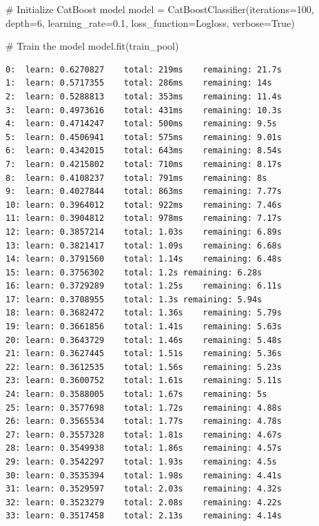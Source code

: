 \documentclass[
  letterpaper,
  DIV=11,
  numbers=noendperiod]{scrartcl}
\newenvironment{Shaded}{\begin{snugshade}}{\end{snugshade}}
\newcommand{\CommentTok}[1]{\textcolor[rgb]{0.37,0.37,0.37}{#1}}
\newcommand{\DecValTok}[1]{\textcolor[rgb]{0.68,0.00,0.00}{#1}}
\newcommand{\FloatTok}[1]{\textcolor[rgb]{0.68,0.00,0.00}{#1}}
\newcommand{\NormalTok}[1]{\textcolor[rgb]{0.00,0.23,0.31}{#1}}
\newcommand{\OperatorTok}[1]{\textcolor[rgb]{0.37,0.37,0.37}{#1}}
\newcommand{\StringTok}[1]{\textcolor[rgb]{0.13,0.47,0.30}{#1}}
\newcommand{\VariableTok}[1]{\textcolor[rgb]{0.07,0.07,0.07}{#1}}
\begin{document}
\begin{Shaded}
\begin{Highlighting}[]
\CommentTok{\# Initialize CatBoost model}
\NormalTok{model }\OperatorTok{=}\NormalTok{ CatBoostClassifier(iterations}\OperatorTok{=}\DecValTok{100}\NormalTok{, depth}\OperatorTok{=}\DecValTok{6}\NormalTok{, learning\_rate}\OperatorTok{=}\FloatTok{0.1}\NormalTok{, loss\_function}\OperatorTok{=}\StringTok{\textquotesingle{}Logloss\textquotesingle{}}\NormalTok{, verbose}\OperatorTok{=}\VariableTok{True}\NormalTok{)}

\CommentTok{\# Train the model}
\NormalTok{model.fit(train\_pool)}
\end{Highlighting}
\end{Shaded}

\begin{verbatim}
0:  learn: 0.6270827    total: 219ms    remaining: 21.7s
1:  learn: 0.5717355    total: 286ms    remaining: 14s
2:  learn: 0.5288813    total: 353ms    remaining: 11.4s
3:  learn: 0.4973616    total: 431ms    remaining: 10.3s
4:  learn: 0.4714247    total: 500ms    remaining: 9.5s
5:  learn: 0.4506941    total: 575ms    remaining: 9.01s
6:  learn: 0.4342015    total: 643ms    remaining: 8.54s
7:  learn: 0.4215802    total: 710ms    remaining: 8.17s
8:  learn: 0.4108237    total: 791ms    remaining: 8s
9:  learn: 0.4027844    total: 863ms    remaining: 7.77s
10: learn: 0.3964012    total: 922ms    remaining: 7.46s
11: learn: 0.3904812    total: 978ms    remaining: 7.17s
12: learn: 0.3857214    total: 1.03s    remaining: 6.89s
13: learn: 0.3821417    total: 1.09s    remaining: 6.68s
14: learn: 0.3791560    total: 1.14s    remaining: 6.48s
15: learn: 0.3756302    total: 1.2s remaining: 6.28s
16: learn: 0.3729289    total: 1.25s    remaining: 6.11s
17: learn: 0.3708955    total: 1.3s remaining: 5.94s
18: learn: 0.3682472    total: 1.36s    remaining: 5.79s
19: learn: 0.3661856    total: 1.41s    remaining: 5.63s
20: learn: 0.3643729    total: 1.46s    remaining: 5.48s
21: learn: 0.3627445    total: 1.51s    remaining: 5.36s
22: learn: 0.3612535    total: 1.56s    remaining: 5.23s
23: learn: 0.3600752    total: 1.61s    remaining: 5.11s
24: learn: 0.3588005    total: 1.67s    remaining: 5s
25: learn: 0.3577698    total: 1.72s    remaining: 4.88s
26: learn: 0.3565534    total: 1.77s    remaining: 4.78s
27: learn: 0.3557328    total: 1.81s    remaining: 4.67s
28: learn: 0.3549938    total: 1.86s    remaining: 4.57s
29: learn: 0.3542297    total: 1.93s    remaining: 4.5s
30: learn: 0.3535394    total: 1.98s    remaining: 4.41s
31: learn: 0.3529597    total: 2.03s    remaining: 4.32s
32: learn: 0.3523279    total: 2.08s    remaining: 4.22s
33: learn: 0.3517458    total: 2.13s    remaining: 4.14s

\end{verbatim}
\end{document}
